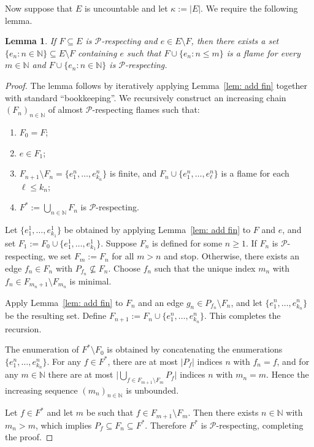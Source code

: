 \documentclass[12pt,a4paper]{amsart}
\theoremstyle{plain}
\newtheorem{lemma}[theorem]{Lemma}
\theoremstyle{definition}
\begin{document}
Now suppose that $E$ is uncountable and let $\kappa:=|E|$. We require the following
lemma.

\begin{lemma}\label{lem: add countable}
If $F\subseteq E$ is $\mathcal{P}$-respecting and $e\in E\setminus F$, then there exists
a set $\{e_n : n\in\mathbb{N}\}\subseteq E\setminus F$ containing $e$ such that
$F\cup\{e_n : n\leq m\}$ is a flame for every $m\in\mathbb{N}$ and
$F\cup\{e_n : n\in\mathbb{N}\}$ is $\mathcal{P}$-respecting.
\end{lemma}

\begin{proof}
The lemma follows by iteratively applying Lemma~\ref{lem: add fin} together with
standard ``bookkeeping''. We recursively construct an increasing chain
$(F_n)_{n\in\mathbb{N}}$ of almost $\mathcal{P}$-respecting flames such that:
\begin{enumerate}[label=(\arabic*)]
\item $F_0=F$;
\item $e\in F_1$;
\item $F_{n+1}\setminus F_n=\{e^n_1,\dots,e^n_{k_n}\}$ is finite, and
      $F_n\cup\{e^n_1,\dots,e^n_\ell\}$ is a flame for each $\ell\leq k_n$;
\item $F^*:=\bigcup_{n\in\mathbb{N}} F_n$ is $\mathcal{P}$-respecting.
\end{enumerate}

Let $\{e^1_1,\dots,e^1_{k_1}\}$ be obtained by applying Lemma~\ref{lem: add fin} to $F$
and $e$, and set $F_1:=F_0\cup\{e^1_1,\dots,e^1_{k_1}\}$. Suppose $F_n$ is defined for
some $n\geq 1$. If $F_n$ is $\mathcal{P}$-respecting, we set $F_m:=F_n$ for all $m>n$
and stop. Otherwise, there exists an edge $f_n\in F_n$ with $P_{f_n}\not\subseteq F_n$.
Choose $f_n$ such that the unique index $m_n$ with
$f_n\in F_{m_n+1}\setminus F_{m_n}$ is minimal.

Apply Lemma~\ref{lem: add fin} to $F_n$ and an edge $g_n\in P_{f_n}\setminus F_n$, and
let $\{e^n_1,\dots,e^n_{k_n}\}$ be the resulting set. Define
$F_{n+1}:=F_n\cup\{e^n_1,\dots,e^n_{k_n}\}$. This completes the recursion.

The enumeration of $F^*\setminus F_0$ is obtained by concatenating the enumerations
$\{e^n_1,\dots,e^n_{k_n}\}$. For any $f\in F^*$, there are at most $|P_f|$ indices $n$
with $f_n=f$, and for any $m\in\mathbb{N}$ there are at most
$\bigl|\bigcup_{f\in F_{m+1}\setminus F_m} P_f\bigr|$ indices $n$ with $m_n=m$. Hence the increasing
sequence $(m_n)_{n\in\mathbb{N}}$ is unbounded.

Let $f\in F^*$ and let $m$ be such that $f\in F_{m+1}\setminus F_m$. Then there exists
$n\in\mathbb{N}$ with $m_n>m$, which implies $P_f\subseteq F_n\subseteq F^*$. Therefore
$F^*$ is $\mathcal{P}$-respecting, completing the proof.
\end{proof}
\end{document}
